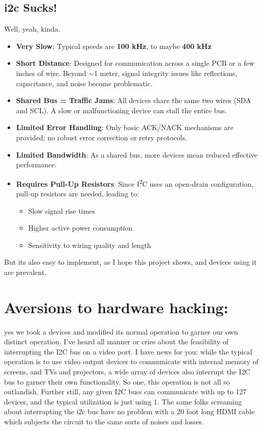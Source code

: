 \documentclass[]{article}
\begin{document}
\subsection{i2c Sucks!} Well, yeah, kinda.
\begin{itemize}
	\item \textbf{Very Slow}: Typical speeds are \textbf{100 kHz}, to maybe \textbf{400 kHz}
	\item \textbf{Short Distance}: Designed for communication across a single PCB or a few inches of wire. Beyond $\sim$1 meter, signal integrity issues like reflections, capacitance, and noise become problematic.
	\item \textbf{Shared Bus = Traffic Jams}: All devices share the same two wires (SDA and SCL). A slow or malfunctioning device can stall the entire bus.
	\item \textbf{Limited Error Handling}: Only basic ACK/NACK mechanisms are provided; no robust error correction or retry protocols.
	\item \textbf{Limited Bandwidth}: As a shared bus, more devices mean reduced effective performance.
	\item \textbf{Requires Pull-Up Resistors}: Since I\textsuperscript{2}C uses an open-drain configuration, pull-up resistors are needed, leading to:
	\begin{itemize}
		\item Slow signal rise times
		\item Higher active power consumption
		\item Sensitivity to wiring quality and length
	\end{itemize}
\end{itemize} 
But its also easy to implement, as I hope this project shows, and devices using it are prevalent. 

\section{Aversions to hardware hacking:} yes we took a devices and modified its normal operation to garner our own distinct operation. I've heard all manner or cries about the feasibility of interrupting the I2C bus on a video port. I have news for you: while the typical operation is to use video output devices to communicate with internal memory of screens, and TVs and projectors, a wide array of devices also interrupt the I2C bus to garner their own functionality. So one, this operation is not all so outlandish. Further still, any given I2C buss can communicate with up to 127 devices, and the typical utilization is just using 1. The same folks screaming about interrupting the i2c bus have no problem with a 20 foot long HDMI cable which subjects the circuit to the same sorts of noises and losses.  
\end{document}
